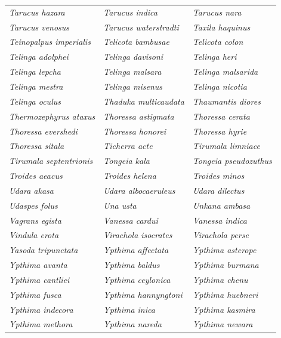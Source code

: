 \documentclass[runningheads]{llncs}
\begin{document}
\begin{longtable}{lll}
\textit{Tarucus hazara} & \textit{Tarucus indica} & \textit{Tarucus nara} \\
\textit{Tarucus venosus} & \textit{Tarucus waterstradti} & \textit{Taxila haquinus} \\
\textit{Teinopalpus imperialis} & \textit{Telicota bambusae} & \textit{Telicota colon} \\
\textit{Telinga adolphei} & \textit{Telinga davisoni} & \textit{Telinga heri} \\
\textit{Telinga lepcha} & \textit{Telinga malsara} & \textit{Telinga malsarida} \\
\textit{Telinga mestra} & \textit{Telinga misenus} & \textit{Telinga nicotia} \\
\textit{Telinga oculus} & \textit{Thaduka multicaudata} & \textit{Thaumantis diores} \\
\textit{Thermozephyrus ataxus} & \textit{Thoressa astigmata} & \textit{Thoressa cerata} \\
\textit{Thoressa evershedi} & \textit{Thoressa honorei} & \textit{Thoressa hyrie} \\
\textit{Thoressa sitala} & \textit{Ticherra acte} & \textit{Tirumala limniace} \\
\textit{Tirumala septentrionis} & \textit{Tongeia kala} & \textit{Tongeia pseudozuthus} \\
\textit{Troides aeacus} & \textit{Troides helena} & \textit{Troides minos} \\
\textit{Udara akasa} & \textit{Udara albocaeruleus} & \textit{Udara dilectus} \\
\textit{Udaspes folus} & \textit{Una usta} & \textit{Unkana ambasa} \\
\textit{Vagrans egista} & \textit{Vanessa cardui} & \textit{Vanessa indica} \\
\textit{Vindula erota} & \textit{Virachola isocrates} & \textit{Virachola perse} \\
\textit{Yasoda tripunctata} & \textit{Ypthima affectata} & \textit{Ypthima asterope} \\
\textit{Ypthima avanta} & \textit{Ypthima baldus} & \textit{Ypthima burmana} \\
\textit{Ypthima cantliei} & \textit{Ypthima ceylonica} & \textit{Ypthima chenu} \\
\textit{Ypthima fusca} & \textit{Ypthima hannyngtoni} & \textit{Ypthima huebneri} \\
\textit{Ypthima indecora} & \textit{Ypthima inica} & \textit{Ypthima kasmira} \\
\textit{Ypthima methora} & \textit{Ypthima nareda} & \textit{Ypthima newara} \\

\end{longtable}
\end{document}
